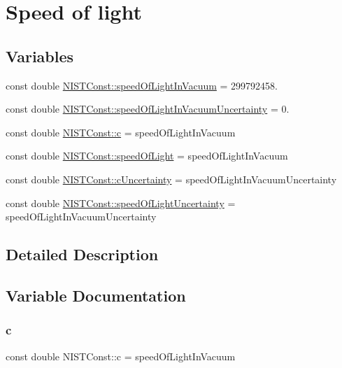 \hypertarget{group___speed_of_light}{}\section{Speed of light}
\label{group___speed_of_light}
\subsection*{Variables}
\begin{DoxyCompactItemize}
\item 
const double \hyperlink{group___speed_of_light_gacb4a04d9cca33259effabdd28c28e964}{N\+I\+S\+T\+Const\+::speed\+Of\+Light\+In\+Vacuum} = 299792458.
\item 
const double \hyperlink{group___speed_of_light_gafb67b7afe777d6e23a70ae69e83542d1}{N\+I\+S\+T\+Const\+::speed\+Of\+Light\+In\+Vacuum\+Uncertainty} = 0.
\item 
const double \hyperlink{group___speed_of_light_ga2bd39b3a464ca74134be618ed1cf1798}{N\+I\+S\+T\+Const\+::c} = speed\+Of\+Light\+In\+Vacuum
\item 
const double \hyperlink{group___speed_of_light_ga0be1be2f994cccb0cc27bac50f6dd7a3}{N\+I\+S\+T\+Const\+::speed\+Of\+Light} = speed\+Of\+Light\+In\+Vacuum
\item 
const double \hyperlink{group___speed_of_light_ga21cb144a81f599986c7d6aff034bf6cb}{N\+I\+S\+T\+Const\+::c\+Uncertainty} = speed\+Of\+Light\+In\+Vacuum\+Uncertainty
\item 
const double \hyperlink{group___speed_of_light_ga456f26aa497d53d4b78f7a4d7644c269}{N\+I\+S\+T\+Const\+::speed\+Of\+Light\+Uncertainty} = speed\+Of\+Light\+In\+Vacuum\+Uncertainty
\end{DoxyCompactItemize}


\subsection{Detailed Description}


\subsection{Variable Documentation}
\mbox{\label{group___speed_of_light_ga2bd39b3a464ca74134be618ed1cf1798}} 
\subsubsection{\texorpdfstring{c}{c}}
{\footnotesize\ttfamily const double N\+I\+S\+T\+Const\+::c = speed\+Of\+Light\+In\+Vacuum}

